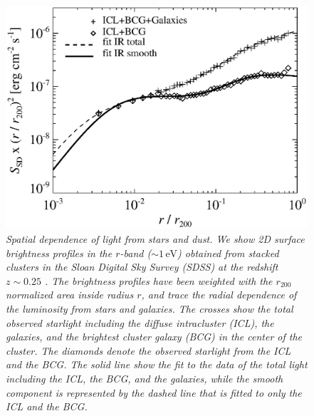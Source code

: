 \documentclass[10pt,aps,pra,reprint,amsmath,amsfonts,amssymb,showpacs]{revtex4-1}
\newcommand{\rmn}{\mathrm}
\newcommand{\ev}{\rmn{eV}}
\newcommand{\rvir}{r_{200}}
\begin{document}
\begin{figure}%
 \includegraphics[width=0.99\columnwidth]{figures/SB.photon.eps}
\caption{\it Spatial dependence of light from stars and dust. We show
  2D surface brightness profiles in the $r$-band ($\sim 1\,\ev$)
  obtained from stacked clusters in the Sloan Digital Sky Survey
  (SDSS) at the redshift $z \sim 0.25$ \cite{2005MNRAS.358..949Z}. The
  brightness profiles have been weighted with the $\rvir$ normalized
  area inside radius $r$, and trace the radial dependence of the
  luminosity from stars and galaxies. The crosses show the total
  observed starlight including the diffuse intracluster (ICL), the
  galaxies, and the brightest cluster galaxy (BCG) in the center of
  the cluster. The diamonds denote the observed starlight from the
  ICL and the BCG. The solid line show the fit to the data of the
  total light including the ICL, the BCG, and the galaxies, while the
  smooth component is represented by the dashed line that is fitted to
  only the ICL and the BCG.}
 \label{fig:SD_spatial}
\end{figure}
\end{document}
